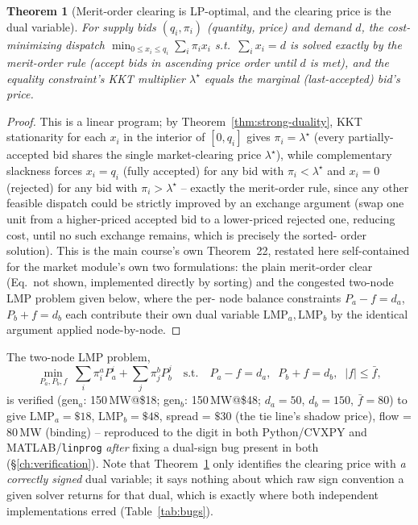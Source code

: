 \documentclass[11pt]{report}
\theoremstyle{plain}
\newtheorem{theorem}{Theorem}[chapter]
\theoremstyle{definition}
\theoremstyle{remark}
\begin{document}
\begin{theorem}[Merit-order clearing is LP-optimal, and the clearing price is the dual variable]
\label{thm:merit-order}
For supply bids $(q_i,\pi_i)$ (quantity, price) and demand $d$, the
cost-minimizing dispatch $\min_{0\le x_i\le q_i}\sum_i\pi_ix_i$ s.t.\
$\sum_ix_i=d$ is solved exactly by the merit-order rule (accept bids in
ascending price order until $d$ is met), and the equality constraint's
KKT multiplier $\lambda^\star$ equals the marginal (last-accepted)
bid's price.
\end{theorem}
\begin{proof}
This is a linear program; by Theorem~\ref{thm:strong-duality}, KKT
stationarity for each $x_i$ in the interior of $[0,q_i]$ gives
$\pi_i=\lambda^\star$ (every partially-accepted bid shares the single
market-clearing price $\lambda^\star$), while complementary slackness
forces $x_i=q_i$ (fully accepted) for any bid with $\pi_i<\lambda^\star$
and $x_i=0$ (rejected) for any bid with $\pi_i>\lambda^\star$ -- exactly
the merit-order rule, since any other feasible dispatch could be
strictly improved by an exchange argument (swap one unit from a
higher-priced accepted bid to a lower-priced rejected one, reducing
cost, until no such exchange remains, which is precisely the sorted-
order solution). This is the main course's own Theorem~22, restated here
self-contained for the market module's own two formulations: the plain
merit-order clear (Eq.\ not shown, implemented directly by sorting) and
the congested two-node LMP problem given below, where the per-
node balance constraints $P_a-f=d_a$, $P_b+f=d_b$ each contribute their
own dual variable $\text{LMP}_a,\text{LMP}_b$ by the identical
argument applied node-by-node.
\end{proof}

The two-node LMP problem,
\begin{equation}
\min_{P_a,P_b,f}\; \sum_i \pi_i^a P_a^i + \sum_j \pi_j^b P_b^j
\quad\text{s.t.}\quad P_a-f=d_a,\;\; P_b+f=d_b,\;\; \left|f\right|\le\bar f,
\label{eq:two-node}
\end{equation}
is verified (gen$_a$: 150\,MW@\$18; gen$_b$: 150\,MW@\$48; $d_a=50$,
$d_b=150$, $\bar f=80$) to give $\text{LMP}_a=\$18$,
$\text{LMP}_b=\$48$, spread = $\$30$ (the tie line's shadow price), flow
= $80$\,MW (binding) -- reproduced to the digit in both Python/CVXPY and
MATLAB/\texttt{linprog} \emph{after} fixing a dual-sign bug present in
both (\S\ref{ch:verification}). Note that Theorem~\ref{thm:merit-order}
only identifies the clearing price with \emph{a correctly signed} dual
variable; it says nothing about which raw sign convention a given
solver returns for that dual, which is exactly where both independent
implementations erred (Table~\ref{tab:bugs}).
\end{document}
